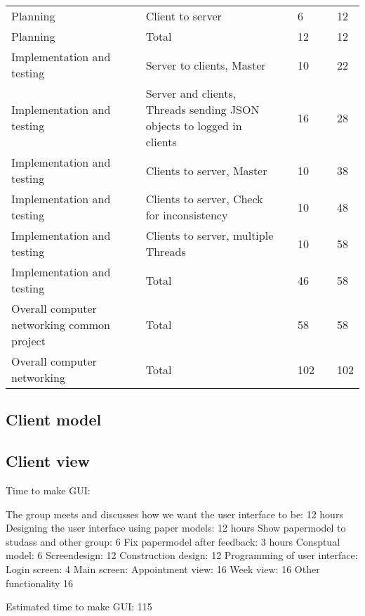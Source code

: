 \documentclass[a4paper, english, 12pt]{article}
\begin{document}
\begin{table}[h]
\begin{center}
\begin{tabular}{ll}
	Planning && Client to server && 6 && 12 \\
	Planning && Total && 12 && 12 \\
	Implementation and testing && Server to clients, Master && 10 && 22 \\
	Implementation and testing && Server and clients, Threads sending JSON objects to logged in clients && 16 && 28 \\
	Implementation and testing && Clients to server, Master && 10 && 38 \\
	Implementation and testing && Clients to server, Check for inconsistency && 10 && 48 \\
	Implementation and testing && Clients to server, multiple Threads && 10 && 58 \\
	Implementation and testing && Total && 46 && 58 \\
	Overall computer networking common project && Total && 58 && 58 \\
	Overall computer networking && Total && 102 && 102 \\ 
        \hline
    \end{tabular}
    \end{center}
\end{table}


\subsection{Client model}

\subsection{Client view}
Time to make GUI:

The group meets and discusses how we want the user interface to be: 12 hours
Designing the user interface using paper models: 12 hours
Show papermodel to studass and other group: 6
Fix papermodel after feedback: 3 hours
Consptual model: 6
Screendesign: 12
Construction design: 12
	Programming of user interface: 
	Login screen: 4
	Main screen:
		Appointment view: 16
		Week view: 16
		Other functionality 16

Estimated time to make GUI: 115
\end{document}
